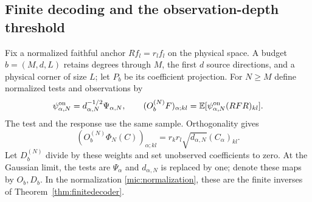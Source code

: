 \documentclass[11pt,a4paper]{amsart}
\numberwithin{equation}{section}
\theoremstyle{definition}
\theoremstyle{remark}
\newcommand{\E}{\mathbb E}
\begin{document}
\subsection{Finite decoding and the observation-depth threshold}
Fix a normalized faithful anchor $Rf_l=r_lf_l$ on the physical space. A budget $b=(M,d,L)$ retains degrees through $M$, the first $d$ source directions, and a physical corner of size $L$; let $P_b$ be its coefficient projection. For $N\ge M$ define normalized tests and observations by
\begin{equation}\label{mic:marks}
 \psi^{\rm on}_{\alpha,N}=d_{\alpha,N}^{-1/2}\Psi_{\alpha,N},\qquad
 (O_b^{(N)}F)_{\alpha;kl}
 =\E[\psi^{\rm on}_{\alpha,N}(RFR)_{kl}].
\end{equation}
The test and the response use the same sample. Orthogonality gives
\begin{equation}\label{mic:inverse}
 (O_b^{(N)}\Phi_N(C))_{\alpha;kl}
   =r_kr_l\sqrt{d_{\alpha,N}}(C_\alpha)_{kl}.
\end{equation}
Let $D_b^{(N)}$ divide by these weights and set unobserved coefficients to zero. At the Gaussian limit, the tests are $\Psi_\alpha$ and $d_{\alpha,N}$ is replaced by one; denote these maps by $O_b,D_b$. In the normalization \eqref{mic:normalization}, these are the finite inverses of Theorem~\ref{thm:finitedecoder}.
\end{document}
